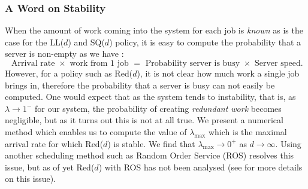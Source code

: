 \documentclass[12pt]{report}
\begin{document}
\subsubsection{A Word on Stability}
When the amount of work coming into the system for each job is \textit{known} as is the case for the LL($d$) and SQ($d$) policy, it is easy to compute the probability that a server is non-empty as we have :
$$
\mbox{ Arrival rate } \times \mbox{ work from 1 job } = \mbox{ Probability server is busy } \times \mbox{ Server speed}.
$$
However, for a policy such as Red($d$), it is not clear how much work a single job brings in, therefore the probability that a server is busy can not easily be computed. One would expect that as the system tends to instability, that is, as $\lambda \rightarrow 1^-$ for our system, the probability of creating \textit{redundant work} becomes negligible, but as it turns out this is not at all true. We present a numerical method which enables us to compute the value of $\lambda_{\max}$ which is the maximal arrival rate for which Red($d$) is stable. We find that $\lambda_{\max} \rightarrow 0^+$ as $d\rightarrow \infty$. Using another scheduling method such as Random Order Service (ROS) resolves this issue, but as of yet Red($d$) with ROS has not been analysed (see \cite{anton2019stability} for more details on this issue).
\end{document}
